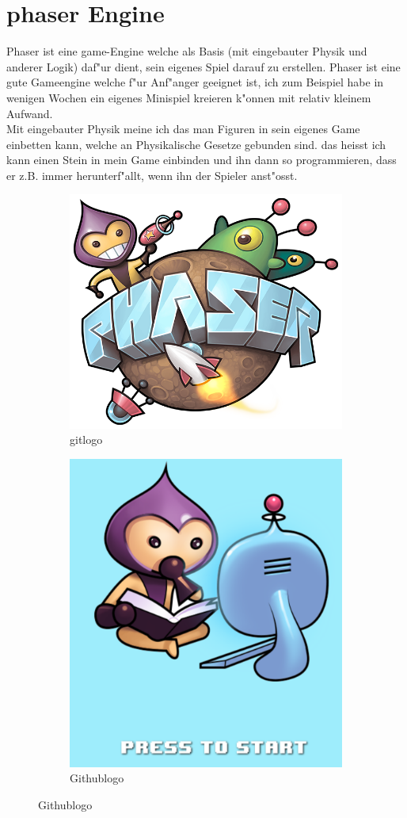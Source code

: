 \documentclass{article}
\begin{document}
\section{phaser Engine}
Phaser ist eine game-Engine welche als Basis (mit eingebauter Physik und anderer Logik) daf"ur dient, sein eigenes Spiel darauf zu erstellen.
Phaser ist eine gute Gameengine welche f"ur Anf"anger geeignet ist, ich zum Beispiel habe in wenigen Wochen ein eigenes Minispiel kreieren k"onnen mit
relativ kleinem Aufwand.\\
Mit eingebauter Physik meine ich das man Figuren in sein eigenes Game einbetten kann, welche an Physikalische Gesetze gebunden sind.
das heisst ich kann einen Stein in mein Game einbinden und ihn dann so programmieren, dass er z.B. immer herunterf"allt, wenn ihn der Spieler anst"osst.
\begin{figure}[ht]
\centering
\begin{subfigure}{.5\textwidth}
  \centering
  \includegraphics[width=.5\linewidth]{phaser}
  \caption{gitlogo}
  \label{fig:sub1}
\end{subfigure}%
\begin{subfigure}{.5\textwidth}
  \centering
  \includegraphics[width=.5\linewidth]{foto}
  \caption{Githublogo}
  \label{fig:sub2}
\end{subfigure}
\end{figure}
\end{document}
